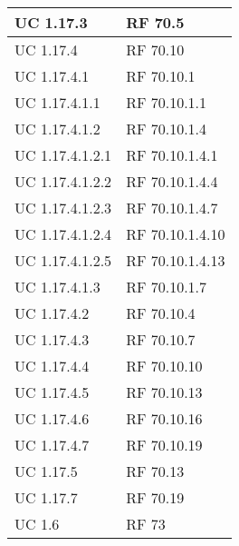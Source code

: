 {\begin{longtable} [c]{| p{4cm} | p{4cm} |}
UC 1.17.3 & RF 70.5\\ 
 \hline 
UC 1.17.4 & RF 70.10\\ 
 \hline 
UC 1.17.4.1 & RF 70.10.1\\ 
 \hline 
UC 1.17.4.1.1 & RF 70.10.1.1\\ 
 \hline 
UC 1.17.4.1.2 & RF 70.10.1.4\\ 
 \hline 
UC 1.17.4.1.2.1 & RF 70.10.1.4.1\\ 
 \hline 
UC 1.17.4.1.2.2 & RF 70.10.1.4.4\\ 
 \hline 
UC 1.17.4.1.2.3 & RF 70.10.1.4.7\\ 
 \hline 
UC 1.17.4.1.2.4 & RF 70.10.1.4.10\\ 
 \hline 
UC 1.17.4.1.2.5 & RF 70.10.1.4.13\\ 
 \hline 
UC 1.17.4.1.3 & RF 70.10.1.7\\ 
 \hline 
UC 1.17.4.2 & RF 70.10.4\\ 
 \hline 
UC 1.17.4.3 & RF 70.10.7\\ 
 \hline 
UC 1.17.4.4 & RF 70.10.10\\ 
 \hline 
UC 1.17.4.5 & RF 70.10.13\\ 
 \hline 
UC 1.17.4.6 & RF 70.10.16\\ 
 \hline 
UC 1.17.4.7 & RF 70.10.19\\ 
 \hline 
UC 1.17.5 & RF 70.13\\ 
 \hline 
UC 1.17.7 & RF 70.19\\ 
 \hline 
UC 1.6 & RF 73\\ 
 \hline 
\end{longtable}}